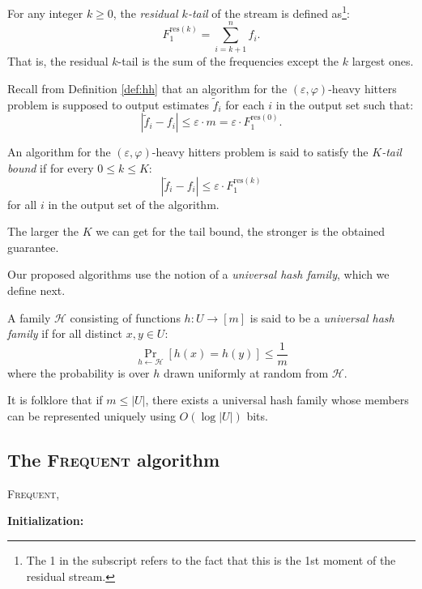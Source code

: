 \documentclass[sigconf,review=true,anonymous=true,screen]{acmart}
\newcommand{\eps}{\varepsilon}
\begin{document}
For any integer $k \geq 0$, the {\em residual $k$-tail} of the stream is defined as\footnote{The 1 in the subscript refers to the fact that this is the 1st moment of the residual stream.}:
$$F_1^{\text{res}(k)} = \sum_{i=k+1}^n f_i.$$
That is, the residual $k$-tail is the sum of the frequencies except the $k$ largest ones. 

Recall from Definition \ref{def:hh} that an algorithm for the $(\eps, \varphi)$-heavy hitters problem is supposed to output estimates $\tilde{f}_i$ for each $i$ in the output set such that:
$$|\tilde{f}_i - f_i| \leq \eps \cdot m = \eps\cdot F_1^{\text{res}(0)}.$$
\begin{definition}\label{def:tailbd}
An algorithm for the $(\eps,\varphi)$-heavy hitters problem is said to satisfy the {\em $K$-tail bound} if for every $0\leq k\leq K$:
$$|\tilde{f}_i - f_i| \leq \eps \cdot F_1^{\text{res}(k)}$$
for all $i$ in the output set of the algorithm.
\end{definition}
The larger the $K$ we can get for the tail bound, the stronger is the obtained guarantee. 


Our proposed algorithms use the notion of a {\em universal hash family}, which we define next.
\begin{definition}
A family $\mathcal{H}$ consisting of functions $h: U \to [m]$ is said to be a {\em universal hash family} if 
for all distinct $x, y \in U$:
$$\Pr_{h \leftarrow \mathcal{H}}[h(x)=h(y)] \leq \frac1m$$
where the probability is over $h$ drawn uniformly at random from $\mathcal{H}$. 
\end{definition}
It is folklore that if $m \leq |U|$, there exists a universal hash family whose members can be represented uniquely using $O(\log |U|)$ bits.

\subsection{The \textsc{Frequent} algorithm}   
    \begin{algorithm}
    	\caption{\textsc{Frequent}, \cite{MG82}}
	\label{fig:freq}
    	\SetAlgoLined
	

	\textbf{Initialization:}

    \end{algorithm}
\end{document}
